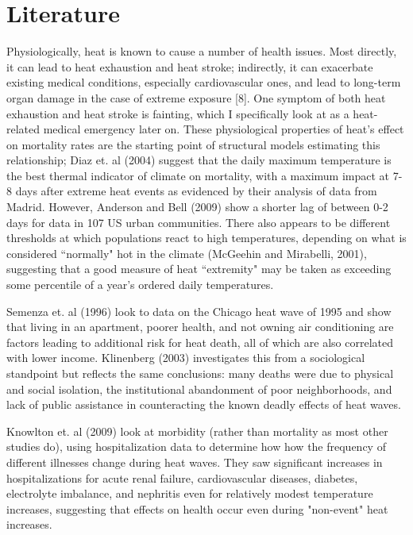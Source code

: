 \documentclass[11pt, oneside]{article}      %
\begin{document}
\section{Literature}
Physiologically, heat is known to cause a number of health issues. Most directly, it can lead to heat exhaustion and heat stroke; indirectly, it can exacerbate existing medical conditions, especially cardiovascular ones, and lead to long-term organ damage in the case of extreme exposure [8]. One symptom of both heat exhaustion and heat stroke is fainting, which I specifically look at as a heat-related medical emergency later on. These physiological properties of heat's effect on mortality rates are the starting point of structural models estimating this relationship; Diaz et. al (2004) suggest that the daily maximum temperature is the best thermal indicator of climate on mortality, with a maximum impact at 7-8 days after extreme heat events as evidenced by their analysis of data from Madrid. However, Anderson and Bell (2009) show a shorter lag of between 0-2 days for data in 107 US urban communities. There also appears to be different thresholds at which populations react to high temperatures, depending on what is considered ``normally" hot in the climate (McGeehin and Mirabelli, 2001), suggesting that a good measure of heat ``extremity" may be taken as exceeding some percentile of a year's ordered daily temperatures.

Semenza et. al (1996) look to data on the Chicago heat wave of 1995 and show that living in an apartment, poorer health, and not owning air conditioning are factors leading to additional risk for heat death, all of which are also correlated with lower income. Klinenberg (2003) investigates this from a sociological standpoint but reflects the same conclusions: many deaths were due to physical and social isolation, the institutional abandonment of poor neighborhoods, and lack of public assistance in counteracting the known deadly effects of heat waves.

Knowlton et. al (2009) look at morbidity (rather than mortality as most other studies do), using hospitalization data to determine how how the frequency of different illnesses change during heat waves. They saw significant increases in hospitalizations for acute renal failure, cardiovascular diseases, diabetes, electrolyte imbalance, and nephritis even for relatively modest temperature increases, suggesting that effects on health occur even during "non-event" heat increases.
\end{document}
